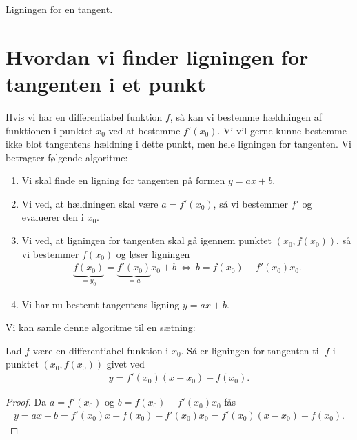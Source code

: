 \begin{center}
\Huge
Ligningen for en tangent.
\end{center}
\section*{Hvordan vi finder ligningen for tangenten i et punkt}


Hvis vi har en differentiabel funktion $f$, så kan vi bestemme hældningen af funktionen i punktet $x_0$ ved at bestemme $f'(x_0).$
Vi vil gerne kunne bestemme ikke blot tangentens hældning i dette punkt, men hele ligningen for tangenten. Vi betragter følgende algoritme:
\begin{enumerate}[label=\roman*)]
	\item Vi skal finde en ligning for tangenten på formen $y=ax+b$. 
	\item Vi ved, at hældningen skal være $a = f'(x_0)$, så vi bestemmer $f'$ og evaluerer den i $x_0$.
	\item Vi ved, at ligningen for tangenten skal gå igennem punktet $(x_0,f(x_0))$, så vi bestemmer $f(x_0)$ og løser ligningen 
	\begin{align*}
		\underbrace{f(x_0)}_{=y_0} = \underbrace{f'(x_0)}_{=a}x_0 + b\ \Leftrightarrow\ b = f(x_0) - f'(x_0)x_0.
	\end{align*}
	\item Vi har nu bestemt tangentens ligning $y = ax + b$.
\end{enumerate}
Vi kan samle denne algoritme til en sætning:
\begin{setn}
	Lad $f$ være en differentiabel funktion i $x_0$. Så er ligningen for tangenten til $f$ i punktet $(x_0,f(x_0))$ givet ved
	\begin{align*}
		y = f'(x_0)(x-x_0) + f(x_0).
	\end{align*}
\end{setn}
\begin{proof}
	Da $a = f'(x_0)$ og $b =  f(x_0) - f'(x_0)x_0$ fås 
	\begin{align*}
		y = ax+b = f'(x_0)x + f(x_0)-f'(x_0)x_0 = f'(x_0)(x-x_0) + f(x_0).
	\end{align*}
\end{proof}
